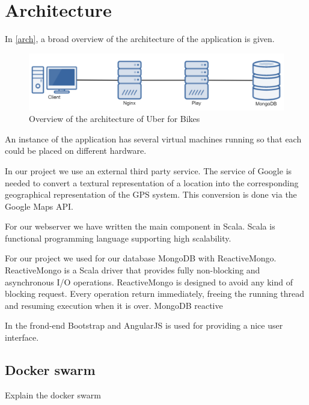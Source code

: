 \section{Architecture}
In \autoref{arch}, a broad overview of the architecture of the application is given. 

    \begin{figure}[H]
		\centering
		\includegraphics[width=1.0\textwidth]{images/Architecture.png}
		\caption{Overview of the architecture of Uber for Bikes}
		\label{arch}
	\end{figure}
	
An instance of the application has several virtual machines running so that each could be placed on different hardware. 

In our project we use an external third party service. The service of Google is needed to convert a textural representation of a location into the corresponding geographical representation of the GPS system. This conversion is done via the Google Maps API.


For our webserver we have written the main component in Scala. Scala is functional programming language supporting high scalability.

For our project we used for our database MongoDB with ReactiveMongo. ReactiveMongo is a Scala driver that provides fully non-blocking and asynchronous I/O operations. ReactiveMongo is designed to avoid any kind of blocking request. Every operation return immediately, freeing the running thread and resuming execution when it is over.
MongoDB reactive


In the frond-end Bootstrap and AngularJS is used for providing a nice user interface.  

\subsection{Docker swarm}

Explain the docker swarm
